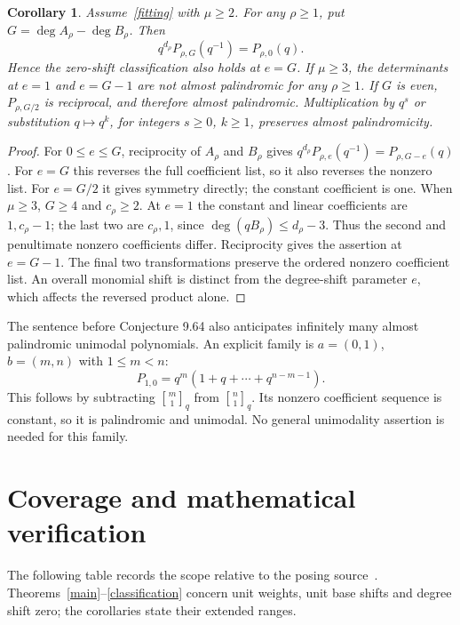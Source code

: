 \documentclass[11pt,a4paper]{article}
\newcommand{\qbin}[2]{\genfrac{[}{]}{0pt}{}{#1}{#2}_{q}}
\newtheorem{corollary}[theorem]{Corollary}
\begin{document}
\begin{corollary}\label{shifted}
Assume~\eqref{fitting} with $\mu\ge2$. For any $\rho\ge1$, put
$G=\deg A_\rho-\deg B_\rho$.
Then
\[
 q^{d_\rho}P_{\rho,G}(q^{-1})=P_{\rho,0}(q).
\]
Hence the zero-shift classification also holds at $e=G$.
If $\mu\ge3$, the determinants at $e=1$ and $e=G-1$ are not almost
palindromic for any $\rho\ge1$.
If $G$ is even, $P_{\rho,G/2}$ is reciprocal, and therefore almost
palindromic. Multiplication by $q^s$ or substitution $q\mapsto q^k$,
for integers $s\ge0$, $k\ge1$, preserves almost palindromicity.
\end{corollary}
\begin{proof}
For $0\le e\le G$, reciprocity of $A_\rho$ and $B_\rho$ gives
$q^{d_\rho}P_{\rho,e}(q^{-1})=P_{\rho,G-e}(q)$.
For $e=G$ this reverses the full coefficient list, so it also reverses
the nonzero list. For $e=G/2$ it gives symmetry directly; the constant
coefficient is one. When $\mu\ge3$, $G\ge4$ and $c_\rho\ge2$.
At $e=1$ the constant and linear coefficients are $1,c_\rho-1$;
the last two are $c_\rho,1$, since $\deg(qB_\rho)\le d_\rho-3$.
Thus the second and penultimate nonzero coefficients differ.
Reciprocity gives the assertion at $e=G-1$.
The final two transformations preserve the ordered
nonzero coefficient list. An overall monomial shift is distinct from
the degree-shift parameter $e$, which affects the reversed product alone.
\end{proof}

The sentence before Conjecture 9.64 also anticipates infinitely many
almost palindromic unimodal polynomials. An explicit family is
$a=(0,1)$, $b=(m,n)$ with $1\le m<n$:
\[
 P_{1,0}=q^m(1+q+\cdots+q^{n-m-1}).
\]
This follows by subtracting $\qbin{m}{1}$ from $\qbin{n}{1}$.
Its nonzero coefficient sequence is constant, so it is palindromic and
unimodal. No general unimodality assertion is needed for this family.

\section{Coverage and mathematical verification}

The following table records the scope relative to the posing source~\cite{okada}.
Theorems~\ref{main}--\ref{classification} concern unit weights, unit base
shifts and degree shift zero; the corollaries state their extended ranges.
\end{document}
